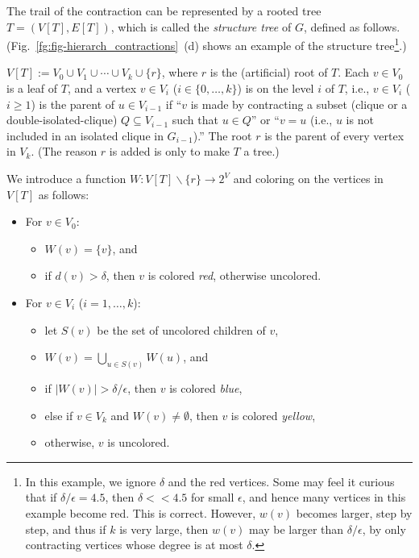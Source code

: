 \documentclass[11pt]{article}
\begin{document}
The trail of the contraction can be represented by a rooted tree $T = (V[T],E[T])$, 
which is called the {\em structure tree} of $G$,  
defined as follows.  
(Fig.~\ref{fg:fig-hierarch_contractions}~(d) shows 
an example of the structure tree\footnote{
In this example, we ignore $\delta$ and the red vertices. Some may feel it curious that if $\delta / \epsilon = 4.5$, then $\delta << 4.5$ for small $\epsilon$, 
and hence many vertices in this example become red. 
This is correct. However, $w(v)$ becomes larger, step by step, and thus 
if $k$ is very large, then $w(v)$ may be larger 
than $\delta / \epsilon$, by only contracting 
vertices whose degree is at most $\delta$. 
}.)


$V[T] := V_0 \cup V_1 \cup \cdots \cup V_k \cup \{ r \}$, 
where $r$ is the (artificial) root of $T$. 
Each $v \in V_0$ is a leaf of $T$, and 
a vertex $v \in V_i$ ($i \in \{ 0, \ldots, k \}$) is on the level $i$ of $T$, 
i.e., 
$v \in V_i$ ($ i  \geq 1$) is the parent of $u \in V_{i-1}$ 
if ``$v$ is made by contracting a subset (clique or a double-isolated-clique) 
$Q \subseteq V_{i-1}$ such that $u \in Q$'' or  
``$v=u$ (i.e., $u$ is not included in an isolated clique in $G_{i-1}$).''
The root $r$ is the parent of every vertex in $V_k$. 
(The reason $r$ is added is only to make $T$ a tree.) 



We introduce a function $W: V[T] \backslash \{ r \} \to 2^{V}$
and coloring on the vertices in $V[T]$ 
as follows: 
\begin{itemize}
  \item For $v \in V_0$: 
  \begin{itemize}
    \item $W(v) = \{ v \}$, and 
    \item if $d(v) > \delta$, then $v$ is colored {\em red}, otherwise uncolored. 
  \end{itemize}
  \item For $v \in V_i$ ($i =1, \ldots, k$): 
  \begin{itemize}
      \item let $S(v)$ be the set of uncolored children of $v$, 
      \item $W(v) = \bigcup_{u \in S(v)} W(u)$, and 
      \item if $|W(v)| > \delta / \epsilon$, then $v$ is colored {\em blue}, 
      \item else if $v \in V_k$ and $W(v) \neq \emptyset$, then $v$ is colored {\em yellow}, 
      \item otherwise, $v$ is uncolored. 
  \end{itemize}
\end{itemize}
\end{document}
